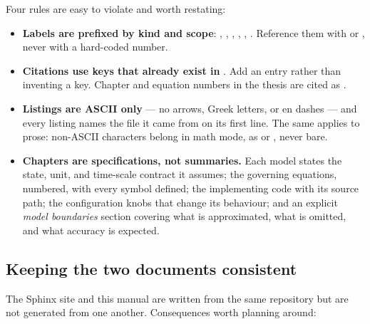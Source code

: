 Four rules are easy to violate and worth restating:

\begin{itemize}[leftmargin=1.4em]
  \item \textbf{Labels are prefixed by kind and scope}: ,
    , ,
    , ,
    . Reference them with
     or , never with a
    hard-coded number.
  \item \textbf{Citations use keys that already exist in }. Add
    an entry rather than inventing a key. Chapter and equation numbers in the
    thesis are cited as
    .
  \item \textbf{Listings are ASCII only} --- no arrows, Greek letters, or en
    dashes --- and every listing names the file it came from on its first
    line. The same applies to prose: non-ASCII characters belong in math mode,
    as  or , never
    bare.
  \item \textbf{Chapters are specifications, not summaries.} Each model states
    the state, unit, and time-scale contract it assumes; the governing
    equations, numbered, with every symbol defined; the implementing code with
    its source path; the configuration knobs that change its behaviour; and an
    explicit \emph{model boundaries} section covering what is approximated,
    what is omitted, and what accuracy is expected.
\end{itemize}

\subsection{Keeping the two documents consistent}

The Sphinx site and this manual are written from the same repository but are
not generated from one another. Consequences worth planning around:

